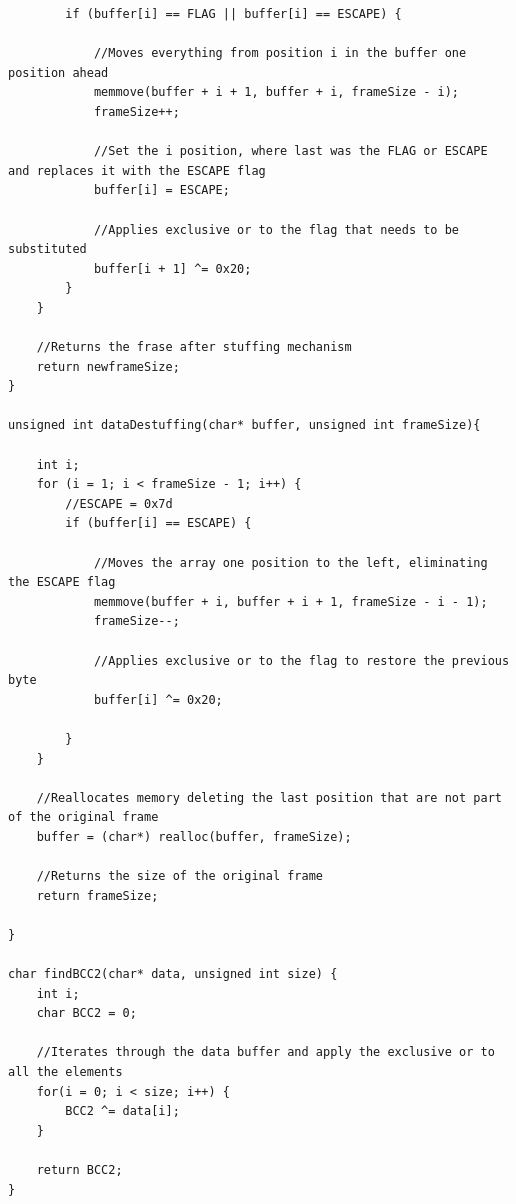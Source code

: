 \documentclass[a4paper]{article}
\begin{document}
\begin{lstlisting}
		if (buffer[i] == FLAG || buffer[i] == ESCAPE) {
		
			//Moves everything from position i in the buffer one position ahead
			memmove(buffer + i + 1, buffer + i, frameSize - i);
			frameSize++;
			
			//Set the i position, where last was the FLAG or ESCAPE and replaces it with the ESCAPE flag
			buffer[i] = ESCAPE;
			
			//Applies exclusive or to the flag that needs to be substituted
			buffer[i + 1] ^= 0x20;
		}
	}
	
	//Returns the frase after stuffing mechanism
	return newframeSize;
}

unsigned int dataDestuffing(char* buffer, unsigned int frameSize){

	int i;
	for (i = 1; i < frameSize - 1; i++) {
		//ESCAPE = 0x7d
		if (buffer[i] == ESCAPE) {
		
			//Moves the array one position to the left, eliminating the ESCAPE flag
			memmove(buffer + i, buffer + i + 1, frameSize - i - 1);
			frameSize--;
			
			//Applies exclusive or to the flag to restore the previous byte
			buffer[i] ^= 0x20;
			
		}
	}
	
	//Reallocates memory deleting the last position that are not part of the original frame
	buffer = (char*) realloc(buffer, frameSize);

	//Returns the size of the original frame
	return frameSize;
	
}

char findBCC2(char* data, unsigned int size) {
	int i;
	char BCC2 = 0;
	
	//Iterates through the data buffer and apply the exclusive or to all the elements
	for(i = 0; i < size; i++) {
		BCC2 ^= data[i];
	}

	return BCC2;
}
\end{lstlisting}
\end{document}
